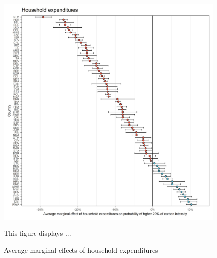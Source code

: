 \documentclass[12pt, a4paper]{article}
\newenvironment{subcaption}
{\strut
\vspace{-5pt}
\begin{minipage}[b]{0.9\textwidth}
  \hspace*{-\parindent}
  \footnotesize}
 {\end{minipage}}
\begin{document}
 \begin{figure}[ht!]
   \centering
   \caption{Average marginal effects of household expenditures } \label{fig:F4_Expenditures}
   \includegraphics{Analysis_Logit_Models_Marginal_Effects/Average_Marginal_Effects_affected_upper_80_log_hh_expenditures_USD_2014}
   \begin{subcaption}
     This figure displays ...
   \end{subcaption}
 \end{figure}

 \clearpage
\end{document}

